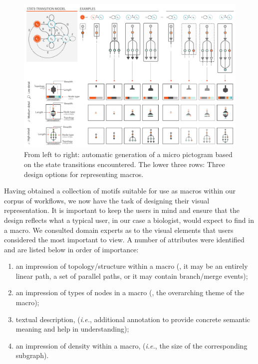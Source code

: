 \begin{figure}[t!]
\centering
\includegraphics[width=\textwidth]{images/automacron/macro-design-options.pdf}
\caption{From left to right: automatic generation of a micro pictogram based on the state transitions encountered.
The lower three rows: Three design options for representing macros.}
\label{fig:design-options}
\vspace{-3mm}
\end{figure}

Having obtained a collection of motifs suitable for use as macros within our corpus of workflows, we now have the task of designing their visual representation.
It is important to keep the users in mind and ensure that the design reflects what a typical user, in our case a biologist, would expect to find in a macro. 
We consulted domain experts as to the visual elements that users considered the most important to view.
A number of attributes were identified and are listed below in order of importance:

\vspace{-2mm}
\begin{enumerate}[itemsep=-1mm]
\item an impression of topology/structure within a macro (\eg, it may be an entirely linear path, a set of parallel paths, or it may contain branch/merge events);
\item an impression of types of nodes in a macro (\eg, the overarching theme of the macro);
\item textual description, (\emph{i.e.}, additional annotation to provide concrete semantic meaning and help in understanding);
\item an impression of density within a macro, (\emph{i.e.}, the size of the corresponding subgraph).
\end{enumerate} 


